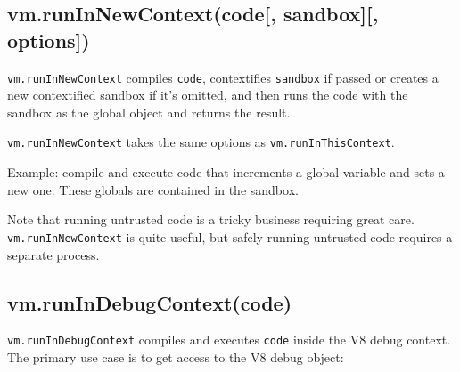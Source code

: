 \subsection{vm.runInNewContext(code{[}, sandbox{]}{[},
options{]})}\label{vm.runinnewcontextcode-sandbox-options}

\texttt{vm.runInNewContext} compiles \texttt{code}, contextifies
\texttt{sandbox} if passed or creates a new contextified sandbox if it's
omitted, and then runs the code with the sandbox as the global object
and returns the result.

\texttt{vm.runInNewContext} takes the same options as
\texttt{vm.runInThisContext}.

Example: compile and execute code that increments a global variable and
sets a new one. These globals are contained in the sandbox.

\begin{Shaded}
\begin{Highlighting}[]
 \NormalTok{(}\NormalTok{);}
 \NormalTok{(}\NormalTok{),}

 
  \NormalTok{: }\NormalTok{,}
  \NormalTok{: }
\NormalTok{\};}

\NormalTok{(}
\NormalTok{(}

\end{Highlighting}
\end{Shaded}

Note that running untrusted code is a tricky business requiring great
care. \texttt{vm.runInNewContext} is quite useful, but safely running
untrusted code requires a separate process.

\subsection{vm.runInDebugContext(code)}\label{vm.runindebugcontextcode}

\texttt{vm.runInDebugContext} compiles and executes \texttt{code} inside
the V8 debug context. The primary use case is to get access to the V8
debug object:

